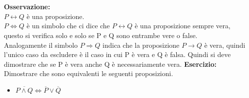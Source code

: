 \documentclass[12pt, letterpaper]{report}
\begin{document}
	\\
	\\
	\textbf{Osservazione: }
	\\
	$P \leftrightarrow Q$ è una proposizione.
	\\
	$P \iff Q$ è un simbolo che ci dice che $P \leftrightarrow Q$ è una proposizione sempre vera, questo si verifica solo e solo se P e Q sono entrambe vere o false.
	\\
	Analogamente il simbolo $P \Rightarrow Q$ indica che la proposizione $P \to Q$ è vera, quindi l'unico caso da escludere è il caso in cui P è vera e Q è falsa.
	Quindi si deve dimostrare che se P è vera anche Q è necessariamente vera.
	\newpage
	\textbf{Esercizio:} Dimostrare che sono equivalenti le seguenti proposizioni.
	\begin{itemize}
		\item $\overline {P \wedge Q} \iff \overline P \vee \overline Q$
	\end{itemize}
\end{document}
